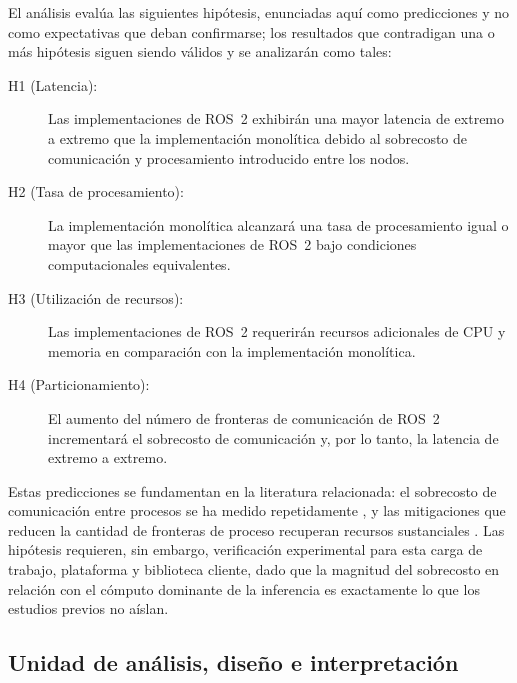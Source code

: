 El análisis evalúa las siguientes hipótesis, enunciadas aquí como
predicciones y no como expectativas que deban confirmarse; los resultados
que contradigan una o más hipótesis siguen siendo válidos y se analizarán
como tales:

\begin{description}
  \item[H1 (Latencia):] Las implementaciones de ROS~2 exhibirán una mayor
        latencia de extremo a extremo que la implementación monolítica
        debido al sobrecosto de comunicación y procesamiento introducido
        entre los nodos.
  \item[H2 (Tasa de procesamiento):] La implementación monolítica
        alcanzará una tasa de procesamiento igual o mayor que las
        implementaciones de ROS~2 bajo condiciones computacionales
        equivalentes.
  \item[H3 (Utilización de recursos):] Las implementaciones de ROS~2
        requerirán recursos adicionales de CPU y memoria en comparación
        con la implementación monolítica.
  \item[H4 (Particionamiento):] El aumento del número de fronteras de
        comunicación de ROS~2 incrementará el sobrecosto de comunicación
        y, por lo tanto, la latencia de extremo a extremo.
\end{description}

Estas predicciones se fundamentan en la literatura relacionada: el
sobrecosto de comunicación entre procesos se ha medido repetidamente
\cite{kronauer2021, macenski2022, kamiya2025}, y las mitigaciones que
reducen la cantidad de fronteras de proceso recuperan recursos sustanciales
\cite{macenski2023}. Las hipótesis requieren, sin embargo, verificación
experimental para esta carga de trabajo, plataforma y biblioteca cliente,
dado que la magnitud del sobrecosto en relación con el cómputo dominante de
la inferencia es exactamente lo que los estudios previos no aíslan.

\subsection{Unidad de análisis, diseño e interpretación}
\label{sec:analysis-unit}

